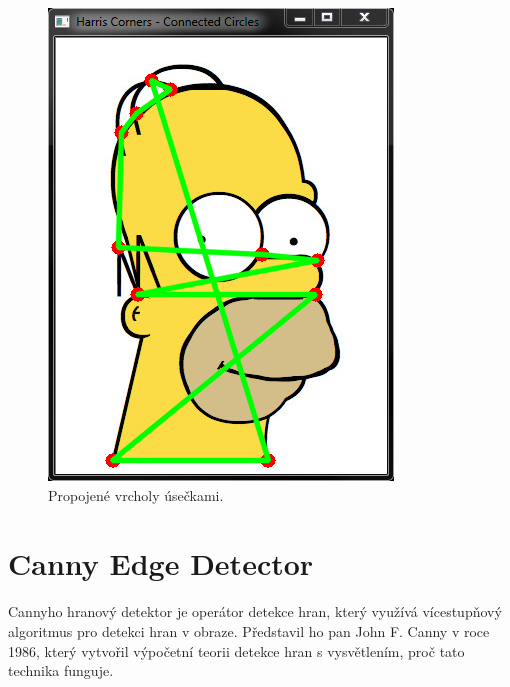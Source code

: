 \documentclass[12pt, a4paper]{article}
\begin{document}
{\begin{figure}[!ht]
\begin{minipage}[t]{0.49\textwidth}
		\includegraphics[width = \textwidth]{HarrisCornersConnectedCircles.png}
		\caption{Propojené vrcholy úsečkami.}
		\label{fig:HarrisCornersConnectedCircles}
	\end{minipage}%
\end{figure}


\newpage






\section{Canny Edge Detector}
\par{Cannyho hranový detektor je operátor detekce hran, který využívá vícestupňový algoritmus pro detekci hran v obraze. Představil ho pan John F. Canny v roce 1986, který vytvořil výpočetní teorii detekce hran s vysvětlením, proč tato technika funguje.}

}
\end{document}
